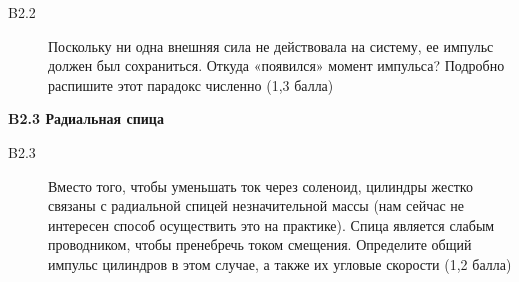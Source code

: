 \documentclass[a4paper, 14pt]{article}
\begin{document}
    \begin{description}
        \item [B2.2] Поскольку ни одна внешняя сила не действовала на систему, ее импульс должен был сохраниться.
        Откуда «появился» момент импульса?
        Подробно распишите этот парадокс численно (1,3 балла)
    \end{description}

    \textbf{B2.3 Радиальная спица}

    \begin{description}
        \item [B2.3] Вместо того, чтобы уменьшать ток через соленоид, цилиндры жестко связаны с радиальной спицей
        незначительной массы (нам сейчас не интересен способ осуществить это на практике).
        Спица является слабым проводником, чтобы пренебречь током смещения.
        Определите общий импульс цилиндров в этом случае, а также их угловые скорости (1,2 балла)
    \end{description}
    \author{
        \begin{flushright}
            предложено

            \textbf{Доц. Проф. Себастьяном ПОПЕСКУ, д-ром наук}

            Физический факультет Ясского университета имени Александру Иона Кузы, РУМЫНИЯ
        \end{flushright}
    }
\end{document}
